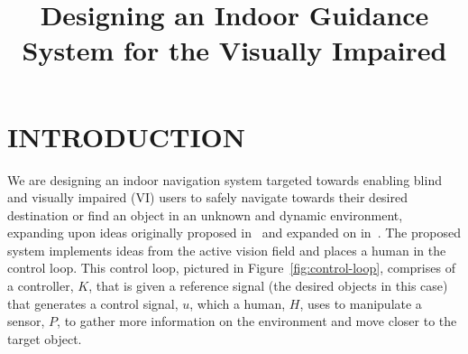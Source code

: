 \documentclass[a4paper, twoside]{article}
\begin{document}
\title{Designing an Indoor Guidance System for the Visually Impaired} 

\author{
}



\onecolumn \maketitle \normalsize \vfill

\section{\uppercase{Introduction}}

\noindent We are designing an indoor navigation system targeted towards enabling blind and visually impaired (VI) users to safely navigate towards their desired destination or find an object in an unknown and dynamic environment, expanding upon ideas originally proposed in~\cite{bellotto2013} and expanded on in~\cite{lock2017portable}. The proposed system implements ideas from the active vision field and places a human in the control loop. This control loop, pictured in Figure~\ref{fig:control-loop}, comprises of a controller, $K$, that is given a reference signal (the desired objects in this case) that generates a control signal, $u$, which a human, $H$, uses to manipulate a sensor, $P$, to gather more information on the environment and move closer to the target object. %
\end{document}
